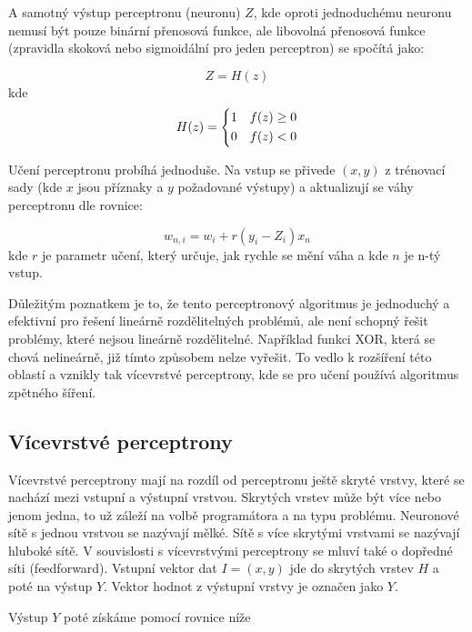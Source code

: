 \documentclass[FM,BP,fonts]{tulthesis}
\begin{document}
A samotný výstup perceptronu (neuronu) $Z$, kde oproti jednoduchému neuronu nemusí být pouze binární přenosová funkce, ale libovolná přenosová funkce (zpravidla skoková nebo sigmoidální pro jeden perceptron) \cite{martinpilatNN} se spočítá jako:

\begin{equation}
	Z = H(z)
\end{equation}
kde
\begin{equation}
	H(z) = \begin{dcases}
		1 & f(z) \geq 0 \\
		0 & f(z) < 0
	\end{dcases}
\end{equation}

Učení perceptronu probíhá jednoduše. Na vstup se přivede $(x,y)$ z trénovací sady (kde $x$ jsou příznaky a $y$ požadované výstupy) a aktualizují se váhy perceptronu dle rovnice:

\begin{equation}\label{eq:learning_percep}
	w_{n,i} = w_i + r(y_i-Z_i)x_n
\end{equation}
kde $r$ je parametr učení, který určuje, jak rychle se mění váha a kde $n$ je n-tý vstup.  

Důležitým poznatkem je to, že tento perceptronový algoritmus je jednoduchý a efektivní pro řešení lineárně rozdělitelných problémů, ale není schopný řešit problémy, které nejsou lineárně rozdělitelné. Například funkci XOR, která se chová nelineárně, již tímto způsobem nelze vyřešit. To vedlo k rozšíření této oblastí a vznikly tak vícevrstvé perceptrony, kde se pro učení používá algoritmus zpětného šíření.




\subsection{Vícevrstvé perceptrony}
Vícevrstvé perceptrony mají na rozdíl od perceptronu ještě skryté vrstvy, které se nachází mezi vstupní a výstupní vrstvou. Skrytých vrstev může být více nebo jenom jedna, to už záleží na volbě programátora a na typu problému. Neuronové sítě s jednou vrstvou se nazývají mělké. Sítě s více skrytými vrstvami se nazývají hluboké sítě. V souvislosti s vícevrstvými perceptrony se mluví také o dopředné síti (feedforward). Vstupní vektor dat $I = (x,y)$ jde do skrytých vrstev $H$ a poté na výstup $Y$. Vektor hodnot z výstupní vrstvy je označen jako $Y$. 

\newpage
Výstup $Y$ poté získáme pomocí rovnice níže 
\end{document}
